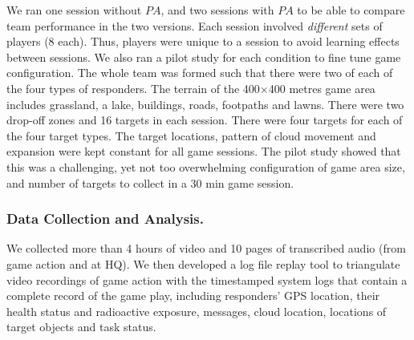 We ran one session without $PA$, and two sessions with $PA$ to be able to compare team performance in the two versions. Each session involved \emph{different} sets of players (8 each). Thus,  players were unique to a session to avoid learning effects between sessions. We also ran a pilot study for each condition to fine tune game configuration. The whole team was formed such that there were two of each of the four types of responders. The terrain of the 400$\times$400 metres  game area includes grassland, a lake, buildings, roads,  footpaths and lawns. There were two  drop-off zones and 16 targets in each session. There were four targets for each of the four target types. The target locations, pattern of cloud movement and expansion were kept constant for all game sessions. The pilot study showed that this was a challenging, yet not too overwhelming configuration of game area size, and number of targets to collect in a 30 min game session. 

\subsubsection{Data Collection and Analysis.}
\noindent 
We collected more than 4 hours of video and 10 pages of transcribed audio (from game action and at HQ). We then developed a log file replay tool to triangulate video recordings of game action with the timestamped system logs that contain a complete record of the game play, including responders' GPS location, their health status and radioactive exposure, messages, cloud location, locations of target objects and task status.

